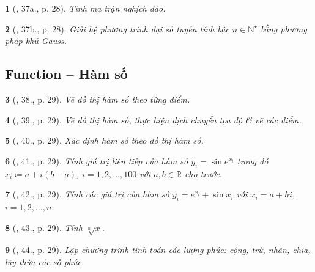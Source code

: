 \documentclass{article}
\newtheorem{baitoan}{}
\begin{document}
\begin{baitoan}[\cite{Doanh_Tuan_Pascal}, 37a., p. 28]
	Tính ma trận nghịch đảo.
\end{baitoan}

\begin{baitoan}[\cite{Doanh_Tuan_Pascal}, 37b., p. 28]
	Giải hệ phương trình đại số tuyến tính bậc $n\in\mathbb{N}^\star$ bằng phương pháp khử Gauss.
\end{baitoan}


\subsection{Function -- Hàm số}

\begin{baitoan}[\cite{Doanh_Tuan_Pascal}, 38., p. 29]
	Vẽ đồ thị hàm số theo từng điểm.
\end{baitoan}

\begin{baitoan}[\cite{Doanh_Tuan_Pascal}, 39., p. 29]
	Vẽ đồ thị hàm số, thực hiện dịch chuyển tọa độ \& vẽ các điểm.
\end{baitoan}

\begin{baitoan}[\cite{Doanh_Tuan_Pascal}, 40., p. 29]
	Xác định hàm số theo đồ thị hàm số.
\end{baitoan}

\begin{baitoan}[\cite{Doanh_Tuan_Pascal}, 41., p. 29]
	Tính giá trị liên tiếp của hàm số $y_i = \sin e^{x_i}$ trong đó $x_i\coloneqq a + i(b - a)$, $i = 1,2,\ldots,100$ với $a,b\in\mathbb{R}$ cho trước.
\end{baitoan}

\begin{baitoan}[\cite{Doanh_Tuan_Pascal}, 42., p. 29]
	Tính các giá trị của hàm số $y_i = e^{x_i} + \sin x_i$ với $x_i = a + hi$, $i = 1,2,\ldots,n$.
\end{baitoan}

\begin{baitoan}[\cite{Doanh_Tuan_Pascal}, 43., p. 29]
	Tính $\sqrt[n]{x}$.
\end{baitoan}

\begin{baitoan}[\cite{Doanh_Tuan_Pascal}, 44., p. 29]
	Lập chương trình tính toán các lượng phức: cộng, trừ, nhân, chia, lũy thừa các số phức.
\end{baitoan}
\end{document}
